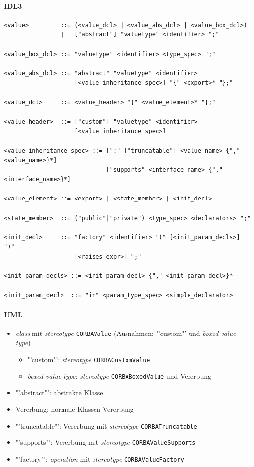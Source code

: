 \documentclass [a4paper,10pt] {scrartcl}
\begin{document}
\paragraph{IDL3}
\begin{verbatim}
<value>         ::= (<value_dcl> | <value_abs_dcl> | <value_box_dcl>)
                |   ["abstract"] "valuetype" <identifier> ";"

<value_box_dcl> ::= "valuetype" <identifier> <type_spec> ";"

<value_abs_dcl> ::= "abstract" "valuetype" <identifier>
                    [<value_inheritance_spec>] "{" <export>* "};"

<value_dcl>     ::= <value_header> "{" <value_element>* "};"

<value_header>  ::= ["custom"] "valuetype" <identifier>
                    [<value_inheritance_spec>]

<value_inheritance_spec> ::= [":" ["truncatable"] <value_name> {"," <value_name>}*]
                             ["supports" <interface_name> {"," <interface_name>}*]

<value_element> ::= <export> | <state_member> | <init_decl>

<state_member>  ::= ("public"|"private") <type_spec> <declarators> ";"

<init_decl>     ::= "factory" <identifier> "(" [<init_param_decls>] ")"
                    [<raises_expr>] ";"

<init_param_decls> ::= <init_param_decl> {"," <init_param_decl>}*

<init_param_decl>  ::= "in" <param_type_spec> <simple_declarator>
\end{verbatim}
\paragraph{UML}
\begin{itemize}
\item \emph{class} mit \emph{stereotype} \texttt{CORBAValue}
(Ausnahmen: "'custom"' und \emph{boxed value type})
    \begin{itemize}
    \item "'custom"': \emph{stereotype} \texttt{CORBACustomValue}
    \item \emph{boxed value type}: \emph{stereotype} \texttt{CORBABoxedValue} und Vererbung
    \end{itemize}
\item "'abstract"': abstrakte Klasse
\item Vererbung: normale Klassen-Vererbung
\item "'truncatable"': Vererbung mit \emph{stereotype} \texttt{CORBATruncatable}
\item "'supports"': Vererbung mit \emph{stereotype} \texttt{CORBAValueSupports}
\item "'factory"': \emph{operation} mit \emph{stereotype} \texttt{CORBAValueFactory}
\end{itemize}
\end{document}
